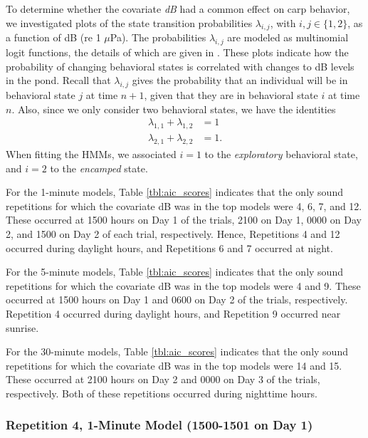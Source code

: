 \documentclass[12pt]{article}
\begin{document}
	To determine whether the covariate \emph{dB} had a common effect on carp behavior, we investigated plots of the state transition probabilities $\lambda_{i, j}$, with $i, j \in \{1, 2\}$, as a function of dB (re 1 $\mu$Pa). The probabilities $\lambda_{i, j}$ are modeled as multinomial logit functions, the details of which are given in \cite{Michelot2016}. These plots indicate how the probability of changing behavioral states is correlated with changes to dB levels in the pond. Recall that $\lambda_{i, j}$ gives the probability that an individual will be in behavioral state $j$ at time $n+1$, given that they are in behavioral state $i$ at time $n$. Also, since we only consider two behavioral states, we have the identities
	\begin{align*}
		\lambda_{1, 1} + \lambda_{1, 2} &= 1 \\
		\lambda_{2, 1} + \lambda_{2, 2} & = 1.
	\end{align*}
	When fitting the HMMs, we associated $i = 1$ to the \emph{exploratory} behavioral state, and $i = 2$ to the \emph{encamped} state.
	
	For the 1-minute models, Table \ref{tbl:aic_scores} indicates that the only sound repetitions for which the covariate dB was in the top models were 4, 6, 7, and 12. These occurred at 1500 hours on Day 1 of the trials, 2100 on Day 1, 0000 on Day 2, and 1500 on Day 2 of each trial, respectively. Hence, Repetitions 4 and 12 occurred during daylight hours, and Repetitions 6 and 7 occurred at night.
	
	For the 5-minute models, Table \ref{tbl:aic_scores} indicates that the only sound repetitions for which the covariate dB was in the top models were 4 and 9. These occurred at 1500 hours on Day 1 and 0600 on Day 2 of the trials, respectively. Repetition 4 occurred during daylight hours, and Repetition 9 occurred near sunrise.
	
	For the 30-minute models, Table \ref{tbl:aic_scores} indicates that the only sound repetitions for which the covariate dB was in the top models were 14 and 15. These occurred at 2100 hours on Day 2 and 0000 on Day 3 of the trials, respectively. Both of these repetitions occurred during nighttime hours.
	
	\subsubsection{Repetition 4, 1-Minute Model (1500-1501 on Day 1)}
	
\end{document}
